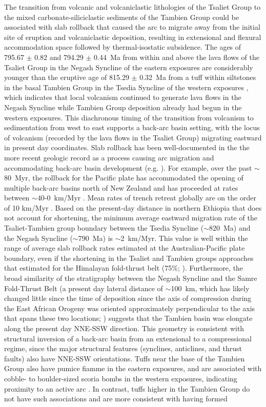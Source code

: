 The transition from volcanic and volcaniclastic lithologies of the Tsaliet Group to the mixed carbonate-siliciclastic sediments of the Tambien Group could be associated with slab rollback that caused the arc to migrate away from the initial site of eruption and volcaniclastic deposition, resulting in extensional and flexural accommodation space followed by thermal-isostatic subsidence. The ages of 795.67 $\pm$ 0.82 and 794.29 $\pm$ 0.44~Ma from within and above the lava flows of the Tsaliet Group in the Negash Syncline of the eastern exposures are considerably younger than the eruptive age of 815.29 $\pm$ 0.32~Ma from a tuff within siltstones in the basal Tambien Group in the Tsedia Syncline of the western exposures \citep{Swanson-Hysell2015a}, which indicates that local volcanism continued to generate lava flows in the Negash Syncline while Tambien Group deposition already had begun in the western exposures. This diachronous timing of the transition from volcanism to sedimentation from west to east supports a back-arc basin setting, with the locus of volcanism (recorded by the lava flows in the Tsaliet Group) migrating eastward in present day coordinates. Slab rollback has been well-documented in the the more recent geologic record as a process causing arc migration and accommodating back-arc basin development (e.g. \citealp{Uyeda1979a, Kastens1988a, Schellart2006a}). For example, over the past $\sim$80~Myr, the rollback for the Pacific plate has accommodated the opening of multiple back-arc basins north of New Zealand and has proceeded at rates between $\sim$40-0~km/Myr \citep{Schellart2006a}. Mean rates of trench retreat globally are on the order of 10 km/Myr \citep{Schellart2008a}. Based on the present-day distance in northern Ethiopia that does not account for shortening, the minimum average eastward migration rate of the Tsaliet-Tambien group boundary between the Tsedia Syncline ($\sim$820~Ma) and the Negash Syncline ($\sim$790~Ma) is $\sim$2~km/Myr. This value is well within the range of average slab rollback rates estimated at the Australian-Pacific plate boundary, even if the shortening in the Tsaliet and Tambien groups approaches that estimated for the Himalayan fold-thrust belt (75\%; \citealp{Long2011a}). Furthermore, the broad similarity of the stratigraphy between the Negash Syncline and the Samre Fold-Thrust Belt (a present day lateral distance of $\sim$100~km, which has likely changed little since the time of deposition since the axis of compression during the East African Orogeny was oriented approximately perpendicular to the axis that spans these two locations; \citealp{Stern1994a}) suggests that the Tambien basin was elongate along the present day NNE-SSW direction. This geometry is consistent with structural inversion of a back-arc basin from an extensional to a compressional regime, since the major structural features (synclines, anticlines, and thrust faults) also have NNE-SSW orientations. Tuffs near the base of the Tambien Group also have pumice fiamme in the eastern exposures, and are associated with cobble- to boulder-sized scoria bombs in the western exposures, indicating proximity to an active arc \citep{Swanson-Hysell2015a}. In contrast, tuffs higher in the Tambien Group do not have such associations and are more consistent with having formed 